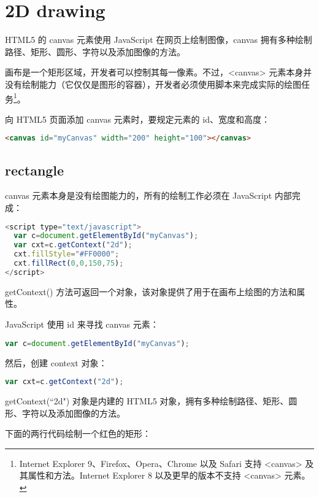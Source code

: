 \section{2D drawing}

HTML5 的 canvas 元素使用 JavaScript 在网页上绘制图像，canvas 拥有多种绘制路径、矩形、圆形、字符以及添加图像的方法。

画布是一个矩形区域，开发者可以控制其每一像素。不过，<canvas> 元素本身并没有绘制能力（它仅仅是图形的容器），开发者必须使用脚本来完成实际的绘图任务\footnote{Internet Explorer 9、Firefox、Opera、Chrome 以及 Safari 支持 <canvas> 及其属性和方法。Internet Explorer 8 以及更早的版本不支持 <canvas> 元素。}。

向 HTML5 页面添加 canvas 元素时，要规定元素的 id、宽度和高度：

\begin{lstlisting}[language=HTML]
<canvas id="myCanvas" width="200" height="100"></canvas>
\end{lstlisting}


\subsection{rectangle}


canvas 元素本身是没有绘图能力的，所有的绘制工作必须在 JavaScript 内部完成：

\begin{lstlisting}[language=JavaScript]
<script type="text/javascript">
  var c=document.getElementById("myCanvas");
  var cxt=c.getContext("2d");
  cxt.fillStyle="#FF0000";
  cxt.fillRect(0,0,150,75);
</script>
\end{lstlisting}

getContext() 方法可返回一个对象，该对象提供了用于在画布上绘图的方法和属性。


JavaScript 使用 id 来寻找 canvas 元素：

\begin{lstlisting}[language=JavaScript]
var c=document.getElementById("myCanvas");
\end{lstlisting}

然后，创建 context 对象：

\begin{lstlisting}[language=JavaScript]
var cxt=c.getContext("2d"); 
\end{lstlisting}

getContext(``2d") 对象是内建的 HTML5 对象，拥有多种绘制路径、矩形、圆形、字符以及添加图像的方法。

下面的两行代码绘制一个红色的矩形：

